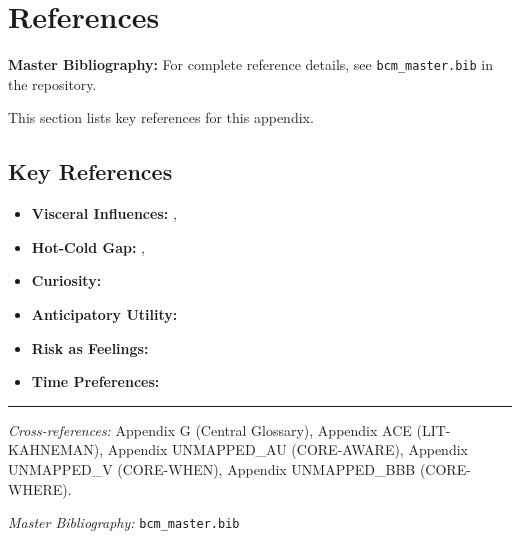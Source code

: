 \section{References}
\label{sec:lo-references}

\begin{tcolorbox}[colback=blue!5!white, colframe=blue!75!black]
\textbf{Master Bibliography:} For complete reference details, see
\texttt{bcm\_master.bib} in the repository.

This section lists key references for this appendix.
\end{tcolorbox}

\vspace{0.5em}

\subsection{Key References}

\begin{itemize}[nosep]
    \item \textbf{Visceral Influences:} \citet{loewenstein1996out}, \citet{loewenstein2005visceral}
    \item \textbf{Hot-Cold Gap:} \citet{loewenstein2006hot}, \citet{loewenstein2000projecting}
    \item \textbf{Curiosity:} \citet{loewenstein1999becausecuriosity}
    \item \textbf{Anticipatory Utility:} \citet{loewenstein1987emotions}
    \item \textbf{Risk as Feelings:} \citet{loewenstein2000emotions}
    \item \textbf{Time Preferences:} \citet{frederick2002time}
\end{itemize}

\nocite{bcm_master}



\vspace{1em}
\hrule
\vspace{0.5em}

\noindent\textit{Cross-references:}
Appendix G (Central Glossary),
Appendix ACE (LIT-KAHNEMAN),
Appendix UNMAPPED_AU (CORE-AWARE),
Appendix UNMAPPED_V (CORE-WHEN),
Appendix UNMAPPED_BBB (CORE-WHERE).

\noindent\textit{Master Bibliography:} \texttt{bcm\_master.bib}


